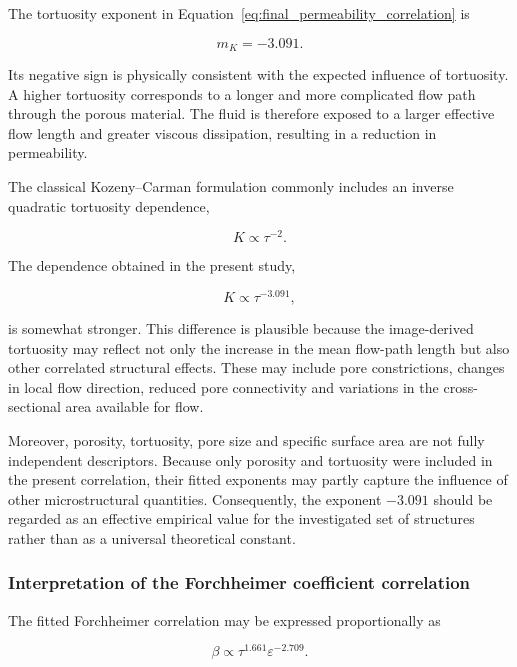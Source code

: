 \documentclass[a4paper]{article}
\begin{document}
The tortuosity exponent in
Equation~\eqref{eq:final_permeability_correlation} is

\begin{equation}
m_{K}
=
-3.091.
\end{equation}

Its negative sign is physically consistent with the expected influence of
tortuosity. A higher tortuosity corresponds to a longer and more complicated
flow path through the porous material. The fluid is therefore exposed to a
larger effective flow length and greater viscous dissipation, resulting in a
reduction in permeability.

The classical Kozeny--Carman formulation commonly includes an inverse
quadratic tortuosity dependence,

\begin{equation}
K
\propto
\tau^{-2}.
\end{equation}

The dependence obtained in the present study,

\begin{equation}
K
\propto
\tau^{-3.091},
\end{equation}

is somewhat stronger. This difference is plausible because the image-derived
tortuosity may reflect not only the increase in the mean flow-path length but
also other correlated structural effects. These may include pore
constrictions, changes in local flow direction, reduced pore connectivity and
variations in the cross-sectional area available for flow.

Moreover, porosity, tortuosity, pore size and specific surface area are not
fully independent descriptors. Because only porosity and tortuosity were
included in the present correlation, their fitted exponents may partly capture
the influence of other microstructural quantities. Consequently, the exponent
$-3.091$ should be regarded as an effective empirical value for the
investigated set of structures rather than as a universal theoretical
constant.

\subsubsection{Interpretation of the Forchheimer coefficient correlation}
\label{sec:interpretation_forchheimer_correlation}

The fitted Forchheimer correlation may be expressed proportionally as

\begin{equation}
\beta
\propto
\tau^{1.661}
\varepsilon^{-2.709}.
\label{eq:forchheimer_proportional_form}
\end{equation}
\end{document}
